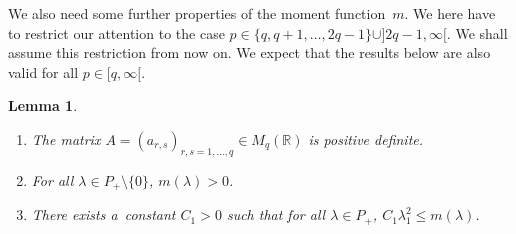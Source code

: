 \documentclass[11pt]{article}
\numberwithin{equation}{section}
\newtheorem{Lemma}[Theorem]{Lemma}
\begin{document}
We also need some further properties of the moment function~$m$.
We here have to restrict our attention to the case $p\in \{q,q+1,\ldots,2q-1\}\cup]2q-1,\infty[$.
We shall assume this restriction from now on.
We expect that the results below are also valid for all $p\in[q,\infty[$.

\begin{Lemma}\label{quad-wachstum}\qquad
\begin{enumerate}\itemsep=0pt
\item[$(1)$] The matrix $A=(a_{r,s})_{r,s=1,\ldots,q}\in M_q(\mathbb R)$ is positive definite.
\item[$(2)$] For all $\lambda\in P_+\setminus\{0\}$, $m(\lambda)>0$.
\item[$(3)$] There exists a~constant $C_1>0$ such that for all $\lambda\in P_+$, $C_1\lambda_1^2\le m(\lambda)$.
\end{enumerate}
\end{Lemma}
\end{document}
